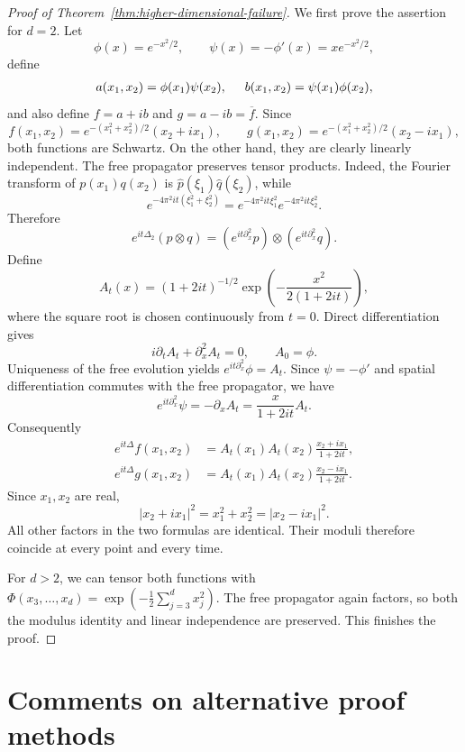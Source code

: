 \documentclass[11pt]{amsart}
\theoremstyle{remark}
\newcommand{\1}{\mathbf 1}
\begin{document}
\begin{proof}[Proof of Theorem~\ref{thm:higher-dimensional-failure}]
We first prove the assertion for $d=2$.  Let
\[
 \phi(x)=e^{-x^2/2},
 \qquad \psi(x)=-\phi'(x)=xe^{-x^2/2},
\]
 define
\begin{align*}
 a(x_1,x_2)=\phi(x_1)\psi(x_2),\hspace{5mm}b(x_1,x_2)=\psi(x_1)\phi(x_2),
\end{align*}
and also define $f=a+ib$ and $g=a-ib = \overline{f}$. Since
\[
 f(x_1,x_2)=e^{-(x_1^2+x_2^2)/2}(x_2+ix_1),
 \qquad
 g(x_1,x_2)=e^{-(x_1^2+x_2^2)/2}(x_2-ix_1),
\]
both functions are Schwartz.  On the other hand, they are clearly linearly independent. The free propagator preserves tensor products.  Indeed, the Fourier transform
of $p(x_1)q(x_2)$ is $\widehat p(\xi_1)\widehat q(\xi_2)$, while
\[
 e^{-4\pi^2it(\xi_1^2+\xi_2^2)}=e^{-4\pi^2it\xi_1^2}e^{-4\pi^2it\xi_2^2}.
\]
Therefore
\[
 e^{it\Delta_2}(p\otimes q)
 =(e^{it\partial_x^2}p)\otimes(e^{it\partial_x^2}q).
\]
Define
\[
 A_t(x)=(1+2it)^{-1/2}
 \exp\!\left(-\frac{x^2}{2(1+2it)}\right),
\]
where the square root is chosen continuously from $t=0$.  Direct
differentiation gives
\[
 i\partial_tA_t+\partial_x^2A_t=0,
 \qquad A_0=\phi.
\]
Uniqueness of the free evolution yields $e^{it\partial_x^2}\phi=A_t$.
Since $\psi=-\phi'$ and spatial differentiation commutes with the free
propagator, we have
\[
 e^{it\partial_x^2}\psi
 =-\partial_xA_t=\frac{x}{1+2it}A_t.
\]
Consequently
\begin{align*}
 e^{it\Delta}f(x_1,x_2)
 &=A_t(x_1)A_t(x_2)\frac{x_2+ix_1}{1+2it},\\
 e^{it\Delta}g(x_1,x_2)
 &=A_t(x_1)A_t(x_2)\frac{x_2-ix_1}{1+2it}.
\end{align*}
Since $x_1,x_2$ are real,
\[
 |x_2+ix_1|^2=x_1^2+x_2^2=|x_2-ix_1|^2.
\]
All other factors in the two formulas are identical.  Their moduli therefore
coincide at every point and every time.

For $d>2$, we can tensor both functions with
$\Phi(x_3,\ldots,x_d)=\exp(-\frac12\sum_{j=3}^dx_j^2)$.  The free propagator
again factors, so both the modulus identity and linear independence are preserved. This finishes the proof.
\end{proof}

\section{Comments on alternative proof methods}
\label{sec:stationary-comments}
\end{document}
